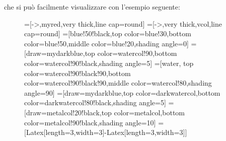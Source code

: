 \documentclass[a4paper]{extarticle}
\begin{document}
\vspace{1em}
\noindent
che si può facilmente visualizzare con l'esempio seguente:

\begin{figure}[H]
  \centering

  =[->,myred,very thick,line cap=round]
  =[->,very thick,vcol,line cap=round]
  =[blue!50!black,top color=blue!30,bottom color=blue!50,middle color=blue!20,shading angle=0]
  =[draw=mydarkblue,top color=watercol!90,bottom color=watercol!90!black,shading angle=5]
  =[water,
    top color=watercol!90!black!90,bottom color=watercol!90!black!90,middle color=watercol!80,shading angle=90]
  =[draw=mydarkblue,top color=darkwatercol,bottom color=darkwatercol!80!black,shading angle=5]
  =[draw=metalcol!20!black,top color=metalcol,bottom color=metalcol!90!black,shading angle=10]
  =[{Latex[length=3,width=3]}-{Latex[length=3,width=3]}]
  \def\tick#1#2{\draw[thick] (#1)++(#2:0.1) --++ (#2-180:0.2)}
\end{figure}
\end{document}
